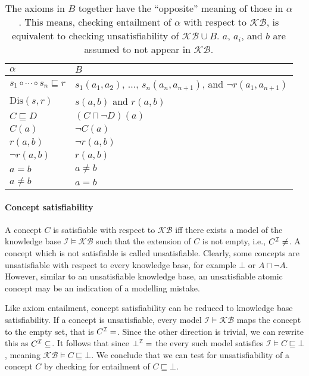 \begin{table}
\begin{tabular}{l|l}
    $\alpha$ & $B$ \\
    \hline
    $s_1 \circ \cdots \circ s_n \sqsubseteq r$ & $s_1(a_1, a_2)$, $\dots$, $s_n(a_n, a_{n + 1})$, and $\lnot r(a_1, a_{n + 1})$ \\
    $\mathrm{Dis}(s, r)$ & $s(a, b)$ and $r(a, b)$ \\
    $C \sqsubseteq D$ & $(C \sqcap \lnot D)(a)$ \\
    $C (a)$ & $\lnot C (a)$ \\
    $r (a, b)$ & $\lnot r(a, b)$ \\
    $\lnot r (a, b)$ & $r (a, b)$ \\
    $a = b$ & $a \not= b$ \\
    $a \not= b$ & $a = b$ \\
\end{tabular}
\label{tab:entailment-reduction}
\caption[Axioms substitution for reduction entailment to satisfiability]{The axioms in $B$ together have the “opposite” meaning of those in $\alpha$. This means, checking entailment of $\alpha$ with respect to $\mathcal{KB}$, is equivalent to checking unsatisfiability of $\mathcal{KB} \cup B$. $a$, $a_i$, and $b$ are assumed to not appear in $\mathcal{KB}$.}
\end{table}

\paragraph{Concept satisfiability} \label{concept-satisfiability}

A concept $C$ is satisfiable with respect to $\mathcal{KB}$ iff there exists a model of the knowledge base $\mathcal{I} \vDash \mathcal{KB}$ such that the extension of $C$ is not empty, i.e., $C^\mathcal{I} \not= \empty$. A concept which is not satisfiable is called unsatisfiable. Clearly, some concepts are unsatisfiable with respect to every knowledge base, for example $\bot$ or $A \sqcap \lnot A$. However, similar to an unsatisfiable knowledge base, an unsatisfiable atomic concept may be an indication of a modelling mistake.

Like axiom entailment, concept satisfiability can be reduced to knowledge base satisfiability. If a concept is unsatisfiable, every model $\mathcal{I} \vDash \mathcal{KB}$ maps the concept to the empty set, that is $C^\mathcal{I} = \empty$. Since the other direction is trivial, we can rewrite this as $C^\mathcal{I} \subseteq \empty$. It follows that since $\bot^\mathcal{I} = \empty$ the every such model satisfies $\mathcal{I} \vDash C \sqsubseteq \bot$, meaning $\mathcal{KB} \vDash C \sqsubseteq \bot$. We conclude that we can test for unsatisfiability of a concept $C$ by checking for entailment of $C \sqsubseteq \bot$.
